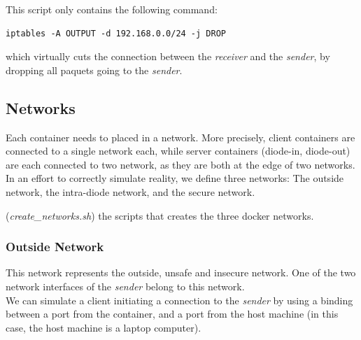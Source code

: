 \documentclass[a4paper,11pt]{article}
\begin{document}
This script only contains the following command:\\
%

\begin{lstlisting}[frame=single] 
iptables -A OUTPUT -d 192.168.0.0/24 -j DROP
\end{lstlisting}

which virtually cuts the connection between the \textit{receiver} and the \textit{sender}, by dropping all paquets going to the \textit{sender}.


\subsection{Networks}
Each container needs to placed in a network. More precisely, client containers are connected to a single network each, while server containers (diode-in, diode-out) are each connected to two network, as they are both at the edge of two networks.\\

In an effort to correctly simulate reality, we define three networks: The outside network, the intra-diode network, and the secure network.

\begin{table}

\caption{(\textit{create\_networks.sh}) the scripts that creates the three docker networks.}
\end{table}

\subsubsection{Outside Network}
This network represents the outside, unsafe and insecure network. One of the two network interfaces of the \textit{sender} belong to this network.\\

We can simulate a client initiating a connection to the \textit{sender} by using a binding between a port from the container, and a port from the host machine (in this case, the host machine is a laptop computer).\\
\end{document}
